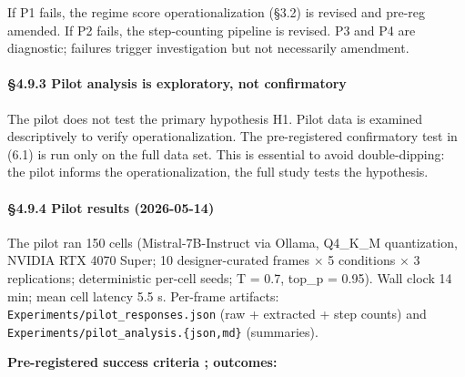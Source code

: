\documentclass{article}
\begin{document}
If P1 fails, the regime score operationalization (\S{}3.2) is revised and
pre-reg amended. If P2 fails, the step-counting pipeline is revised. P3
and P4 are diagnostic; failures trigger investigation but not
necessarily amendment.

\paragraph{\S{}4.9.3 Pilot analysis is exploratory, not
confirmatory}\label{pilot-analysis-is-exploratory-not-confirmatory}

The pilot does not test the primary hypothesis H1. Pilot data is
examined descriptively to verify operationalization. The pre-registered
confirmatory test in (6.1) is run only on the full data set. This is
essential to avoid double-dipping: the pilot informs the
operationalization, the full study tests the hypothesis.

\paragraph{\S{}4.9.4 Pilot results
(2026-05-14)}\label{pilot-results-2026-05-14}

The pilot ran 150 cells (Mistral-7B-Instruct via Ollama, Q4\_K\_M
quantization, NVIDIA RTX 4070 Super; 10 designer-curated frames \ensuremath{\times} 5
conditions \ensuremath{\times} 3 replications; deterministic per-cell seeds; T = 0.7,
top\_p = 0.95). Wall clock 14 min; mean cell latency 5.5 s. Per-frame
artifacts:
\texttt{Experiments/\textasciigrave{}\textasciigrave{}pilot\_responses.json}
(raw + extracted + step counts) and
\texttt{Experiments/\textasciigrave{}\textasciigrave{}pilot\_\textasciigrave{}\textasciigrave{}analysis\textasciigrave{}\textasciigrave{}.\{\textasciigrave{}\textasciigrave{}json,md\textasciigrave{}\textasciigrave{}\}}
(summaries).

\textbf{Pre-registered success criteria ; outcomes:}
\end{document}
